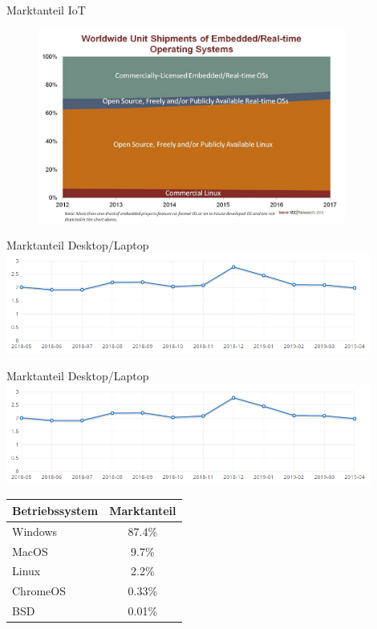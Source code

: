 \documentclass[10pt]{beamer}
\begin{document}
\begin{frame}{Marktanteil IoT}
\begin{figure}
	\includegraphics[keepaspectratio,
	width=0.9\textwidth]{img/iot.jpg}
\end{figure}
\end{frame}


\begin{frame}{Marktanteil Desktop/Laptop}
\includegraphics[keepaspectratio, width=0.9\textwidth]{img/market_share.png}
\end{frame}

\begin{frame}{Marktanteil Desktop/Laptop}
\includegraphics[keepaspectratio, width=0.9\textwidth]{img/market_share.png}

\centering
\begin{table}
\begin{tabular}{l|c}
	\toprule
	\textbf{Betriebssystem} & \textbf{Marktanteil} \\
	\hline
	Windows & 87.4\% \\
	MacOS & 9.7\% \\
	Linux & 2.2\% \\
	ChromeOS & 0.33\% \\
	BSD & 0.01\% \\
	\bottomrule
\end{tabular}
\end{table}	
\end{frame}
\end{document}
